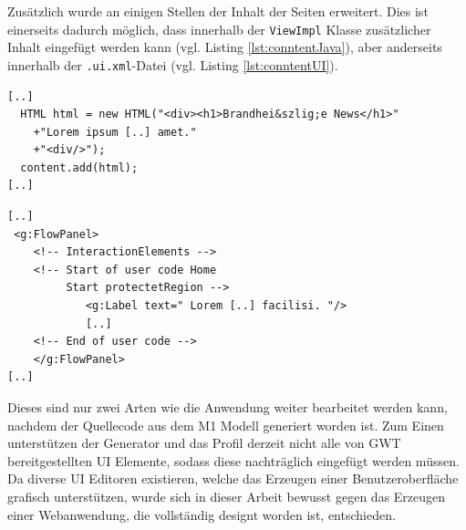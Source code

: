 Zusätzlich wurde an einigen Stellen der Inhalt der Seiten erweitert. Dies ist
einerseits dadurch möglich, dass innerhalb der \texttt{ViewImpl} Klasse
zusätzlicher Inhalt eingefügt werden kann (vgl. Listing \ref{lst:conntentJava}),
aber anderseits innerhalb der \texttt{.ui.xml}-Datei (vgl. Listing
\ref{lst:conntentUI}).

\lstset{language=gwt}
\begin{lstlisting}[caption={Einfügen von Inhalten auf einer Seite durch
Veränderungen am Java-Code},
label={lst:conntentJava}] 
[..] 
  HTML html = new HTML("<div><h1>Brandhei&szlig;e News</h1>"
	+"Lorem ipsum [..] amet."
	+"<div/>");
  content.add(html);
[..]
\end{lstlisting}
\lstset{language=uixml}
\begin{lstlisting}[caption={Einfügen von Inhalten auf einer Seite durch
Veränderungen am \texttt{ui.xml}-Datei},
label={lst:conntentUI}] 
[..] 
 <g:FlowPanel>
	<!-- InteractionElements -->
	<!-- Start of user code Home 
	     Start protectetRegion -->
			<g:Label text=" Lorem [..] facilisi. "/>
			[..]		
	<!-- End of user code -->
	</g:FlowPanel>
[..]
\end{lstlisting}

Dieses sind nur zwei Arten wie die Anwendung weiter bearbeitet werden kann,
nachdem der Quellecode aus dem M1 Modell generiert worden ist. Zum Einen
unterstützen der Generator und das Profil derzeit nicht alle von GWT
bereitgestellten UI Elemente, sodass diese nachträglich eingefügt werden
müssen. Da diverse UI Editoren existieren, welche das Erzeugen einer
Benutzeroberfläche grafisch unterstützen, wurde sich in dieser Arbeit bewusst
gegen das Erzeugen einer Webanwendung, die vollständig designt worden ist,
entschieden. 
